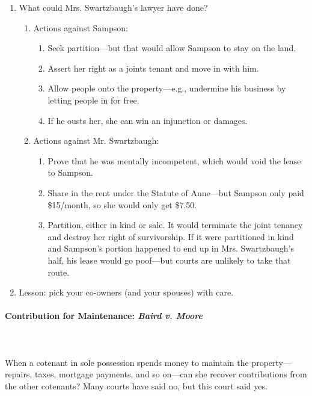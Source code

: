 \begin{enumerate}
    existing contracts giving to Sampson the same right to the possession of 
    the leased property that Swartzbaugh had. It follows that they cannot be 
    cancelled by plaintiff in this action.''\footnote{Casebook p. 354.}
    \item What could Mrs. Swartzbaugh's lawyer have done?
    \begin{enumerate}
        \item Actions against Sampson:
        \begin{enumerate}
            \item Seek partition---but that would allow Sampson to stay on the 
            land.
            \item Assert her right as a joints tenant and move in with him.
            \item Allow people onto the property---e.g., undermine his 
            business by letting people in for free.
            \item If he ousts her, she can win an injunction or damages.
        \end{enumerate}
        \item Actions against Mr. Swartzbaugh:
        \begin{enumerate}
            \item Prove that he was mentally incompetent, which would void the 
            lease to Sampson.
            \item Share in the rent under the Statute of Anne---but Sampson 
            only paid \$15/month, so she would only get \$7.50.
            \item Partition, either in kind or sale. It would terminate the 
            joint tenancy and destroy her right of survivorship. If it were 
            partitioned in kind and Sampson's portion happened to end up in 
            Mrs. Swartzbaugh's half, his lease would go poof---but courts are 
            unlikely to take that route.
        \end{enumerate}
    \end{enumerate}
    \item Lesson: pick your co-owners (and your spouses) with care.
\end{enumerate}

\paragraph{Contribution for Maintenance: \emph{Baird v. Moore}}
~\\\\When a cotenant in sole possession spends money to maintain the 
property---repairs, taxes, mortgage payments, and so on---can she recover 
contributions from the other cotenants? Many courts have said no, but this 
court said yes.

